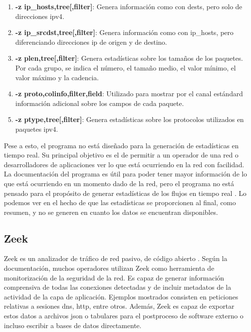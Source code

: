 \begin{enumerate}
    \item \textbf{-z ip\_hosts,tree[,filter]}: Genera información como con dests, pero solo de direcciones \acrshort{ipv4}.
    \item \textbf{-z ip\_srcdst,tree[,filter]}: Genera información como con ip\_hosts, pero diferenciando direcciones \acrshort{ip} de origen y de destino.
    \item \textbf{-z plen,tree[,filter]}: Genera estadísticas sobre los tamaños de los paquetes. Por cada grupo, se indica el número, el tamaño medio, el valor mínimo, el valor máximo y la cadencia.
    \item \textbf{-z proto,colinfo,filter,field}: Utilizado para mostrar por el canal estándard información adicional sobre los campos de cada paquete.
    \item \textbf{-z ptype,tree[,filter]}: Genera estadísticas sobre los protocolos utilizados en paquetes \acrshort{ipv4}.
\end{enumerate}

Pese a esto, el programa no está diseñado para la generación de estadísticas en tiempo real. Su principal objetivo es el de permitir a un operador de una red o desarrolladores de aplicaciones ver lo que está ocurriendo en la red con facilidad. La documentación del programa es útil para poder tener mayor información de lo que está ocurriendo en un momento dado de la red, pero el programa no está pensado para el propósito de generar estadísticas de los flujos en tiempo real \cite{wiresharkrealtimestats}. Lo podemos ver en el hecho de que las estadísticas se proporcionen al final, como resumen, y no se generen en cuanto los datos se encuentran disponibles.

\subsection{Zeek}

Zeek es un analizador de tráfico de red pasivo, de código abierto \cite{zeek_documentation}. Según la documentación, muchos operadores utilizan Zeek como herramienta de monitorización de la seguridad de la red. Es capaz de generar información comprensiva de todas las conexiones detectadas y de incluir metadatos de la actividad de la capa de aplicación. Ejemplos mostrados consisten en peticiones relativas a sesiones \acrshort{dns}, \acrshort{http}, entre otros. Además, Zeek es capaz de exportar estos datos a archivos \acrshort{json} o tabulares para el postproceso de software externo o incluso escribir a bases de datos directamente. 

